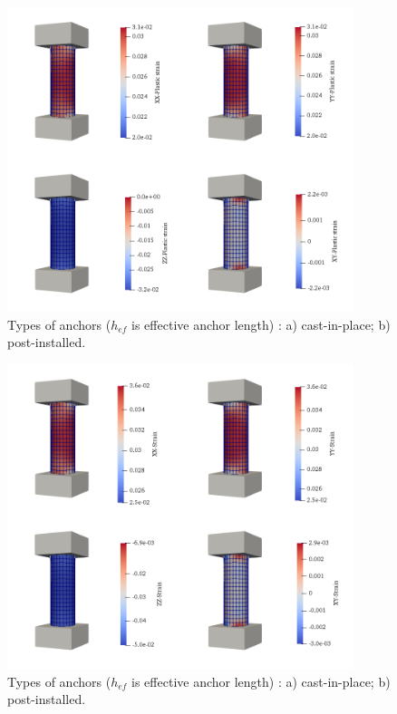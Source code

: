\begin{figure}[h!]
	\centering
	\includegraphics[width=0.9\textwidth]{obrazky/compression_zpevneni_pl_strain.png}
	\caption[Types of anchors]{Types of anchors ($h_{ef}$ is effective anchor length) \cite{anchors-ACI-318M}: a) cast-in-place; b) post-installed.}\label{obr:Compresion_plastic_srain}
\end{figure}


\begin{figure}[h!]
	\centering
	\includegraphics[width=0.9\textwidth]{obrazky/compression_zpevneni_strain.png}
	\caption[Types of anchors]{Types of anchors ($h_{ef}$ is effective anchor length) \cite{anchors-ACI-318M}: a) cast-in-place; b) post-installed.}\label{obr:Compresion_total_strain}
\end{figure}






